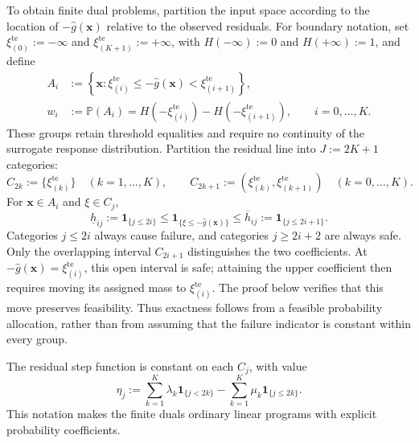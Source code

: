 \documentclass[review,11pt,3p,authoryear,nopreprintline]{elsarticle}
\begin{document}
To obtain finite dual problems, partition the input space according to the location of $-\hat g(\bm x)$ relative to the observed residuals. For boundary notation, set $\xi_{(0)}^{\mathrm{te}}:=-\infty$ and $\xi_{(K+1)}^{\mathrm{te}}:=+\infty$, with $H(-\infty):=0$ and $H(+\infty):=1$, and define
\begin{equation}
  \begin{aligned}
    A_i&:=\left\{\bm x:\xi_{(i)}^{\mathrm{te}}\le-\hat g(\bm x)<\xi_{(i+1)}^{\mathrm{te}}\right\},\\
    w_i&:=\mathbb P(A_i)
    =H\left(-\xi_{(i)}^{\mathrm{te}}\right)-H\left(-\xi_{(i+1)}^{\mathrm{te}}\right),
    \qquad i=0,\ldots,K.
  \end{aligned}
  \label{eq-input-cells}
\end{equation}
These groups retain threshold equalities and require no continuity of the surrogate response distribution. Partition the residual line into $J:=2K+1$ categories:
\begin{equation}
  C_{2k}:=\{\xi_{(k)}^{\mathrm{te}}\}\quad(k=1,\ldots,K),\qquad
  C_{2k+1}:=(\xi_{(k)}^{\mathrm{te}},\xi_{(k+1)}^{\mathrm{te}})\quad(k=0,\ldots,K).
  \label{eq-residual-cells}
\end{equation}
For $\bm x\in A_i$ and $\xi\in C_j$,
\begin{equation}
  \underline h_{ij}:=\mathbf1_{\{j\le2i\}}
  \le\mathbf1_{\{\xi\le -\hat g(\bm x)\}}
  \le\overline h_{ij}:=\mathbf1_{\{j\le2i+1\}}.
  \label{eq-cell-costs}
\end{equation}
Categories $j\le2i$ always cause failure, and categories $j\ge2i+2$ are always safe. Only the overlapping interval $C_{2i+1}$ distinguishes the two coefficients. At $-\hat g(\bm x)=\xi_{(i)}^{\mathrm{te}}$, this open interval is safe; attaining the upper coefficient then requires moving its assigned mass to $\xi_{(i)}^{\mathrm{te}}$. The proof below verifies that this move preserves feasibility. Thus exactness follows from a feasible probability allocation, rather than from assuming that the failure indicator is constant within every group.

The residual step function is constant on each $C_j$, with value
\begin{equation}
  \eta_j:=\sum_{k=1}^K\lambda_k\mathbf1_{\{j<2k\}}
    -\sum_{k=1}^K\mu_k\mathbf1_{\{j\le2k\}}.
  \label{eq-dual-cell-values}
\end{equation}
This notation makes the finite duals ordinary linear programs with explicit probability coefficients.
\end{document}
